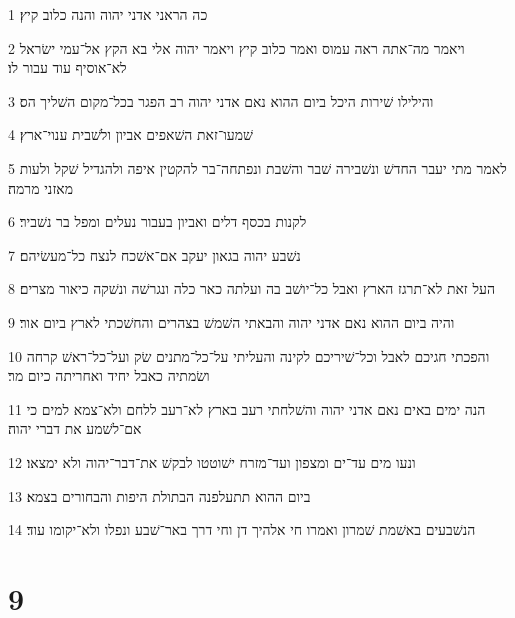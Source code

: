 \par 1 כה הראני אדני יהוה והנה כלוב קיץ׃
\par 2 ויאמר מה־אתה ראה עמוס ואמר כלוב קיץ ויאמר יהוה אלי בא הקץ אל־עמי ישׂראל לא־אוסיף עוד עבור לו׃
\par 3 והילילו שׁירות היכל ביום ההוא נאם אדני יהוה רב הפגר בכל־מקום השׁליך הס׃
\par 4 שׁמעו־זאת השׁאפים אביון ולשׁבית ענוי־ארץ׃
\par 5 לאמר מתי יעבר החדשׁ ונשׁבירה שׁבר והשׁבת ונפתחה־בר להקטין איפה ולהגדיל שׁקל ולעות מאזני מרמה׃
\par 6 לקנות בכסף דלים ואביון בעבור נעלים ומפל בר נשׁביר׃
\par 7 נשׁבע יהוה בגאון יעקב אם־אשׁכח לנצח כל־מעשׂיהם׃
\par 8 העל זאת לא־תרגז הארץ ואבל כל־יושׁב בה ועלתה כאר כלה ונגרשׁה ונשׁקה כיאור מצרים׃
\par 9 והיה ביום ההוא נאם אדני יהוה והבאתי השׁמשׁ בצהרים והחשׁכתי לארץ ביום אור׃
\par 10 והפכתי חגיכם לאבל וכל־שׁיריכם לקינה והעליתי על־כל־מתנים שׂק ועל־כל־ראשׁ קרחה ושׂמתיה כאבל יחיד ואחריתה כיום מר׃
\par 11 הנה ימים באים נאם אדני יהוה והשׁלחתי רעב בארץ לא־רעב ללחם ולא־צמא למים כי אם־לשׁמע את דברי יהוה׃
\par 12 ונעו מים עד־ים ומצפון ועד־מזרח ישׁוטטו לבקשׁ את־דבר־יהוה ולא ימצאו׃
\par 13 ביום ההוא תתעלפנה הבתולת היפות והבחורים בצמא׃
\par 14 הנשׁבעים באשׁמת שׁמרון ואמרו חי אלהיך דן וחי דרך באר־שׁבע ונפלו ולא־יקומו עוד׃

\chapter{9}


